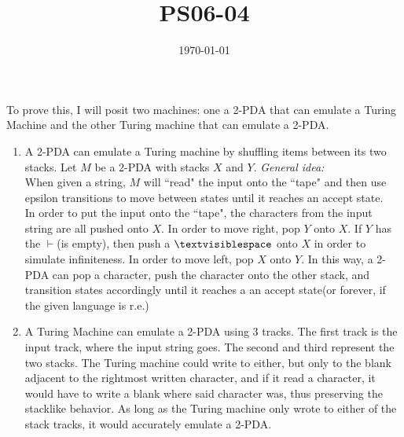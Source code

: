 \documentclass{article}
\title{PS06-04}
\date{\today}
\begin{document}
\maketitle

To prove this, I will posit two machines: one a 2-PDA that can emulate a Turing Machine and the other Turing machine that can emulate a 2-PDA.
\begin{enumerate}[label=\alph*.]
	\item A 2-PDA can emulate a Turing machine by shuffling items between its two stacks. Let $M$ be a 2-PDA with stacks $X$ and $Y$. 
	\textit{General idea:}\\ When given a string, $M$ will ``read" the input onto the ``tape" and then use epsilon transitions to move between states until it reaches an accept state. \\
	In order to put the input onto the ``tape", the characters from the input string are all pushed onto $X$. In order to move right, pop $Y$ onto $X$. If $Y$ has the $\vdash$(is empty), then push a $\textvisiblespace$ onto $X$ in order to simulate infiniteness. In order to move left, pop $X$ onto $Y$. In this way, a 2-PDA can pop a character, push the character onto the other stack, and transition states accordingly until it reaches a an accept state(or forever, if the given language is r.e.) 
	\item A Turing Machine can emulate a 2-PDA using 3 tracks. The first track is the input track, where the input string goes. The second and third represent the two stacks. The Turing machine could write to either, but only to the blank adjacent to the rightmost written character, and if it read a character, it would have to write a blank where said character was, thus preserving the stacklike behavior. As long as the Turing machine only wrote to either of the stack tracks, it would accurately emulate a 2-PDA.
\end{enumerate}
\end{document}
